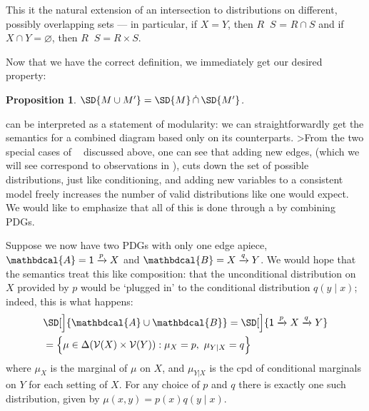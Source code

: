 \documentclass[letterpaper]{article} %
\theoremstyle{plain}
\newtheorem{prop}[theorem]{Proposition}
\theoremstyle{definition}
\theoremstyle{remark}
\newcommand{\notation}[2][]{#1}
\renewcommand{\notation}[2][]{{\color{notationcolor} #2}}
\DeclareMathOperator\dcap{\mathop{\dot\cap}}
\newcommand{\V}{\mathcal V}
\newcommand{\dg}[1]{\mathbdcal{#1}}
\newcommand{\var}[1]{\mathsf{#1}}
\begin{document}
\begin{vfull}
\begin{defn}[$\dcap$]
	This it the natural extension of an intersection to distributions on different, possibly overlapping sets --- in particular, if $X = Y$, then $R \dcap S$ = $R \cap S$ and if \notation[$X$ and $Y$ are disjoint]{$X \cap Y = \varnothing$}, then $R \dcap S = R \times S$. 
\end{defn}


Now that we have the correct definition, we immediately get our desired property:

\begin{prop}\label{prop:union-set-semantics}
	$\SD{M \cup M'} = \SD{M} \dcap \SD{M'}$.
\end{prop}

 can be interpreted as a statement of modularity: we can straightforwardly get the semantics for a combined diagram based only on its counterparts. 
>From the two special cases of $\dcap$ discussed above, one can see that adding new edges, (which we will see correspond to observations in ), cuts down the set of possible distributions, just like conditioning, and adding new variables to a consistent model freely increases the number of valid distributions like one would expect. We would like to emphasize that all of this is done through a by combining PDGs.

\begin{example}\label{ex:sd-compose-unconditional}
	Suppose we now have two PDGs with only one edge apiece, $\dg A = {\var 1} \xrightarrow{p} X$ and $\dg B = X \xrightarrow{q} Y$. We would hope that the semantics treat this like composition: that the unconditional distribution on $X$ provided by $p$ would be `plugged in' to the conditional distribution $q(y \mid x)$; indeed, this is what happens:
	\begin{align*}
		&\SD[\Big]{{\dg A \cup \dg B}} = \SD[\Big]{{\var 1} \xrightarrow{p} X \xrightarrow{q} Y} \\
			&= \Big\{  \mu \in \Delta(\V(X) \times \V(Y)) : \mu_X = p,~\mu_{Y|X} = q \Big\} 
	\end{align*}
	where $\mu_X$ is the marginal of $\mu$ on $X$, and $\mu_{Y|X}$ is the cpd of conditional marginals on $Y$ for each setting of $X$.
	For any choice of $p$ and $q$ there is exactly one such distribution, given by $\mu(x,y) = p(x) q(y \mid x)$.
\end{example}



\end{vfull}
\end{document}
